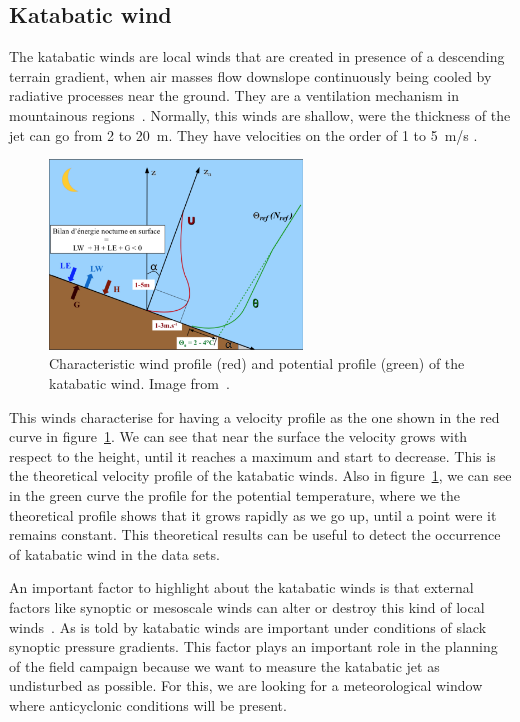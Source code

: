 \documentclass[a4paper,12pt]{article}
\begin{document}
\subsection{Katabatic wind}

The katabatic winds are local winds that are created in presence of a descending terrain gradient, when air masses flow downslope continuously being cooled by radiative processes near the ground. They are a ventilation mechanism in mountainous regions~\citep{manins1979model}. Normally, this winds are shallow, were the thickness of the jet can go from 2 to 20~m. They have velocities on the order of 1 to 5~m/s \citep{stull2012introduction}. 

\begin{figure}[ht!]
	\vspace{-5pt}
    \centering
\includegraphics[width=0.6\textwidth]{fig/profiles_katabatic_wind.png}
    \caption{Characteristic wind profile (red) and potential profile (green) of the katabatic wind. Image from~\cite{claudine}.}
    \label{fig:u_profile}
  \vspace{-5pt}
\end{figure}

This winds characterise for having a velocity profile as the one shown in the red curve in figure~\ref{fig:u_profile}. We can see that near the surface the velocity grows with respect to the height, until it reaches a maximum and start to decrease. This is the theoretical velocity profile of the katabatic winds. Also in figure~\ref{fig:u_profile}, we can see in the green curve the profile for the potential temperature, where we the theoretical profile shows that it grows rapidly as we go up, until a point were it remains constant. This theoretical results can be useful to detect the occurrence of katabatic wind in the data sets.

An important factor to highlight about the katabatic winds is that external factors like synoptic or mesoscale winds can alter or destroy this kind of local winds~\citep{stull2012introduction}. As is told by \cite{manins1979katabatic} katabatic winds are important under conditions of slack synoptic pressure gradients. This factor plays an important role in the planning of the field campaign because we want to measure the katabatic jet as undisturbed as possible. For this, we are looking for a meteorological window where anticyclonic conditions will be present. 
\end{document}
